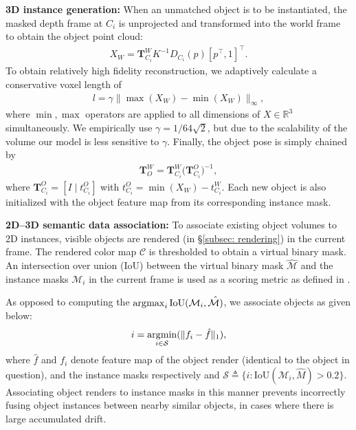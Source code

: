 \textbf{3D instance generation:} When an unmatched object is to be instantiated, the masked depth frame at $C_i$ is unprojected and transformed into the world frame to obtain the object point cloud:
\begin{align}
X_{W} = \mathbf{T}^W_{C_i} K^{-1} D_{C_i}(p) [p^\top, 1]^\top.
\end{align}
To obtain relatively high fidelity reconstruction, we adaptively calculate a conservative voxel length of
\begin{align}
    l = \gamma \| \max(X_W) - \min(X_W) \|_{\infty},
\end{align}
where $\min, \max$ operators are applied to all dimensions of $X \in \mathbb{R}^3$ simultaneously. We empirically use $\gamma = 1 / 64\sqrt{2}$, but due to the scalability of the volume our model is less sensitive to $\gamma$.
Finally, the object pose is simply chained by
\begin{align}
    \mathbf{T}_{O}^W = \mathbf{T}_{C_i}^{W} \bigg({\mathbf{T}_{C_i}^O}\bigg)^{-1},
\end{align}
where $\mathbf{T}_{C_i}^O = [I \mid t_{C_i}^O]$ with $t_{C_i}^O = \min(X_W) - t_{C_i}^W $. Each new object is also initialized with the object feature map from its corresponding instance mask.

\textbf{2D--3D semantic data association:}
To associate existing object volumes to 2D instances, visible objects are rendered (in \S\ref{subsec: rendering}) in the current frame. The rendered color map $\mathcal{C}$ is thresholded to obtain a virtual binary mask. An intersection over union (IoU) between the virtual binary mask $\hat{\mathcal{M}}$ and the instance masks $\mathcal{M}_i$ in the current frame is used as a scoring metric as defined in \cite{mccormacFusionVolumetricObjectLevel2018}.

As opposed to computing the $\operatorname*{\arg\!\max}_{i}{\text{IoU}(\mathcal{M}_i, \hat{\mathcal{M})}}$, we associate objects as given below:
\begin{align}
    i = \operatorname*{\arg\!\min}_{i \in \mathcal{S}} (\| f_i - \hat{f} \|_1),
\end{align}
where $\hat{f}$ and $f_i$ denote feature map of the object render (identical to the object in question), and the instance masks respectively and $\mathcal{S} \triangleq \{i : \text{IoU}(\mathcal{M}_i, \hat{M}) > 0.2\}$.
Associating object renders to instance masks in this manner prevents incorrectly fusing object instances between nearby similar objects, in cases where there is large accumulated drift.

